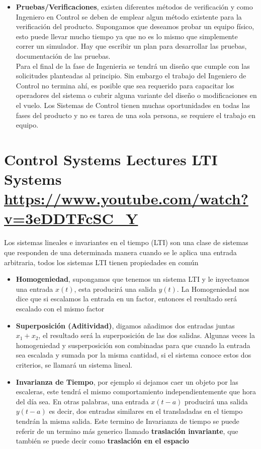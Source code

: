 \documentclass[
	12pt, %
]{fphw}
\begin{document}
\begin{itemize}
\item \textbf{Pruebas/Verificaciones}, existen diferentes métodos de verificación y como Ingeniero en Control se deben de emplear algun método existente para la verificación del producto. Supongamos que deseamos probar un equipo físico, esto puede llevar mucho tiempo ya que no es lo mismo que simplemente correr un simulador. Hay que escribir un plan para desarrollar las pruebas, documentación de las pruebas. \\

  Para el final de la fase de Ingenieria se tendrá un diseño que cumple con las solicitudes planteadas al principio. Sin embargo el trabajo del Ingeniero de Control no termina ahí, es posible que sea requerido para capacitar los operadores del sistema o cubrir alguna variante del diseño o modificaciones en el vuelo. Los Sistemas de Control tienen muchas oportunidades en todas las fases del producto y no es tarea de una sola persona, se requiere el trabajo en equipo.
  
\end{itemize}
\newpage
\section*{{\color{RoyalPurple}Control Systems Lectures LTI Systems} \url{https://www.youtube.com/watch?v=3eDDTFcSC_Y}}

Los sistemas lineales e invariantes en el tiempo (LTI) son una clase de sistemas que responden de una determinada manera cuando se le aplica una entrada arbitraria, todos los sistemas LTI tienen propiedades en común
\begin{itemize}
\item \textbf{Homogeniedad}, supongamos que tenemos un sistema LTI y le inyectamos una entrada $x(t)$, esta producirá una salida $y(t)$. La Homogeniedad nos dice que si escalamos la entrada en un factor, entonces el resultado será escalado con el mismo factor 
\item \textbf{Superposición (Aditividad)}, digamos añadimos dos entradas juntas $x_{1} + x_{2}$, el resultado será la superposición de las dos salidas. Algunas veces la homogeniedad y susperposición son combinadas para que cuando la entrada sea escalada y sumada por la misma cantidad, si el sistema conoce estos dos criterios, se llamará un sistema lineal.
\item \textbf{Invarianza de Tiempo}, por ejemplo si dejamos caer un objeto por las escaleras, este tendrá el mismo comportamiento independientemente que hora del día sea. En otras palabras, una entrada $x(t-a)$ producirá una salida $y(t-a)$ es decir, dos entradas similares en el transladadas en el tiempo tendrán la misma salida. Este termino de Invarianza de tiempo se puede referir de un termino más generico llamado \textbf{traslación invariante}, que también se puede decir como \textbf{traslación en el espacio}
\end{itemize}
\end{document}
